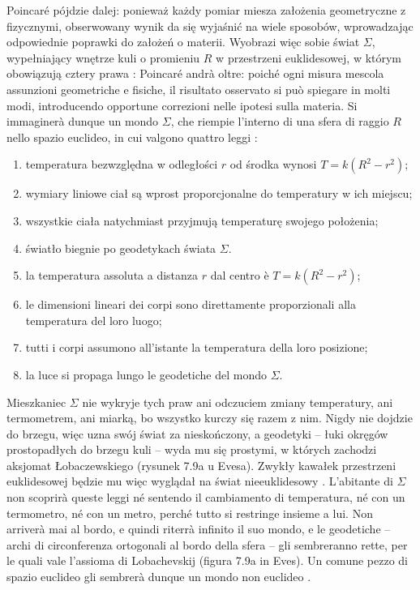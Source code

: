 Poincaré pójdzie dalej: ponieważ każdy pomiar miesza założenia geometryczne z fizycznymi, obserwowany wynik da się wyjaśnić na wiele sposobów, wprowadzając odpowiednie poprawki do założeń o materii. %
Wyobrazi więc sobie świat $\Sigma$, wypełniający wnętrze kuli o promieniu $R$ w przestrzeni euklidesowej, w którym obowiązują cztery prawa \cite[s. 315--316]{eves1_1972}: %
Poincaré andrà oltre: poiché ogni misura mescola assunzioni geometriche e fisiche, il risultato osservato si può spiegare in molti modi, introducendo opportune correzioni nelle ipotesi sulla materia. %
Si immaginerà dunque un mondo $\Sigma$, che riempie l'interno di una sfera di raggio $R$ nello spazio euclideo, in cui valgono quattro leggi \cite[p. 315--316]{eves1_1972}: %
\begin{enumerate}
\item temperatura bezwzględna w odległości $r$ od środka wynosi $T = k(R^2 - r^2)$; %
\item wymiary liniowe ciał są wprost proporcjonalne do temperatury w ich miejscu; %
\item wszystkie ciała natychmiast przyjmują temperaturę swojego położenia; %
\item światło biegnie po geodetykach świata $\Sigma$. %
\item la temperatura assoluta a distanza $r$ dal centro è $T = k(R^2 - r^2)$; %
\item le dimensioni lineari dei corpi sono direttamente proporzionali alla temperatura del loro luogo; %
\item tutti i corpi assumono all'istante la temperatura della loro posizione; %
\item la luce si propaga lungo le geodetiche del mondo $\Sigma$. %
\end{enumerate}
Mieszkaniec $\Sigma$ nie wykryje tych praw ani odczuciem zmiany temperatury, ani termometrem, ani miarką, bo wszystko kurczy się razem z nim. %
Nigdy nie dojdzie do brzegu, więc uzna swój świat za nieskończony, a geodetyki -- łuki okręgów prostopadłych do brzegu kuli -- wyda mu się prostymi, w których zachodzi aksjomat Łobaczewskiego (rysunek 7.9a u Evesa). %
Zwykły kawałek przestrzeni euklidesowej będzie mu więc wyglądał na świat nieeuklidesowy \cite[s. 316--317]{eves1_1972}. %
L'abitante di $\Sigma$ non scoprirà queste leggi né sentendo il cambiamento di temperatura, né con un termometro, né con un metro, perché tutto si restringe insieme a lui. %
Non arriverà mai al bordo, e quindi riterrà infinito il suo mondo, e le geodetiche -- archi di circonferenza ortogonali al bordo della sfera -- gli sembreranno rette, per le quali vale l'assioma di Lobachevskij (figura 7.9a in Eves). %
Un comune pezzo di spazio euclideo gli sembrerà dunque un mondo non euclideo \cite[p. 316--317]{eves1_1972}. %

